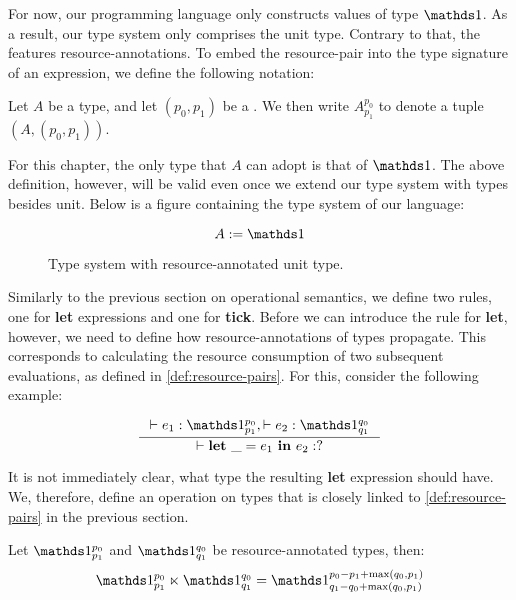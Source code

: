 For now, our programming language only constructs values of type \(\unit\). As a result, our type system only comprises the unit type. Contrary to that, the  features resource-annotations. To embed the resource-pair into the type signature of an expression, we define the following notation:

\begin{definition}\label{def:ra-type}
   Let \(A\) be a type, and let \((p_0, p_1)\) be a . We then write \(A^{p_0}_{p_1}\) to denote a tuple \((A, (p_0, p_1))\).
\end{definition}

For this chapter, the only type that \(A\) can adopt is that of \(\unit\). The above definition, however, will be valid even once we extend our type system with types besides unit. Below is a figure containing the type system of our language:

\begin{figure}[h] \label{fig:type-system}
   \[A := \unit \]
   \caption{Type system with resource-annotated unit type.}
\end{figure}

Similarly to the previous section on operational semantics, we define two rules, one for \textbf{let} expressions and one for \textbf{tick}. Before we can introduce the rule for \textbf{let}, however, we need to define how resource-annotations of types propagate. This corresponds to calculating the resource consumption of two subsequent evaluations, as defined in \cref{def:resource-pairs}. For this, consider the following example:

\[
   \inference[]
   {\typing{}{e_1}{\ratype{\unit}{p_0}{p_1}}, \typing{}{e_2}{\ratype{\unit}{q_0}{q_1}}}
   {\typing{}{\letexp{\_}{e_1}{e_2}}{?}}
\]

It is not immediately clear, what type the resulting \textbf{let} expression should have. We, therefore, define an operation on types that is closely linked to \cref{def:resource-pairs} in the previous section.

\begin{definition}
   \label{def:type-product}
   Let \(\ratype{\unit}{p_0}{p_1}\) and \(\unit^{q_0}_{q_1}\) be resource-annotated types, then: \\
   \[\ratype{\unit}{p_0}{p_1} \ltimes \ratype{\unit}{q_0}{q_1} = \ratype{\unit}{p_0 - p_1 + \max(q_0, p_1)}{q_1 - q_0 + \max(q_0, p_1)}\]
\end{definition}


